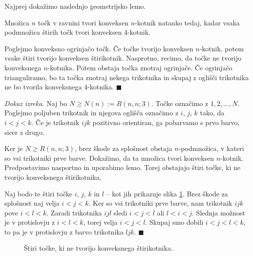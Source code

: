 \documentclass[twoside,11pt]{article}
\begin{document}
Najprej dokažimo naslednjo geometrijsko lemo.
\begin{lema}
    Množica $n$ točk v ravnini tvori konveksen $n$-kotnik natanko tedaj, kadar
    vsaka podmnožica štirih točk tvori konveksen $4$-kotnik.
\end{lema}
\begin{dokaz}
    Poglejmo konveksno ogrinjačo točk. Če točke tvorijo konveksen $n$-kotnik, potem vsake 
    štiri tvorijo konveksen štirikotnik. Nasprotno, recimo, da točke ne tvorijo konveksnega 
    $n$-kotnika. Potem obstaja točka znotraj ogrinjače. Če ogrinjačo trianguliramo, bo ta 
    točka znotraj nekega trikotnika in skupaj z oglišči trikotnika ne bo tvorila 
    konveksnega $4$-kotnika. \hfill $\blacksquare$
\end{dokaz}

\noindent\textit{Dokaz izreka.}
    Naj bo $N \ge N(n) := R(n,n;3)$. Točke označimo z $1, 2, \dots, N$. 
    Poglejmo poljuben trikotnik in njegova oglišča označimo z $i$, $j$, $k$ tako, da $i < j < k$. Če je 
    trikotnik $ijk$ pozitivno orientiran, ga pobarvamo s prvo barvo, sicer z drugo.

    Ker je $N \ge R(n,n;3)$, brez škode za splošnost obstaja $n$-podmnožica, v kateri so 
    vsi trikotniki prve barve. Dokažimo, da ta množica tvori konveksen $n$-kotnik. Predpostavimo 
    nasportno in uporabimo lemo. Torej obstajajo štiri točke, ki ne tvorijo konveksnega 
    štirikotnika. 

    Naj bodo te štiri točke $i$, $j$, $k$ in $l$ -- kot jih prikazuje slika \ref{fig:happy}. 
    Brez škode za splošnost naj velja $i < j < k$. Ker so vsi trikotniki prve barve, nam 
    trikotnik $ijk$ pove $i < l < k$. Zaradi trikotnika  $ijl$ sledi $i < j < l$ 
    ali $l < i < j$. Slednja možnost je v protislovju z $i < l < k$, torej velja $i < j < l$. Skupaj 
    smo dobili $i < j < l < k$, to pa je v protislovju z barvo trikotnika 
    $ljk$. \hfill $\blacksquare$

    \begin{figure}[h!]
        \centering
        \caption{Štiri točke, ki ne tvorijo konveksnega štirikotnika.}
        \label{fig:happy}
    \end{figure}
\end{document}
